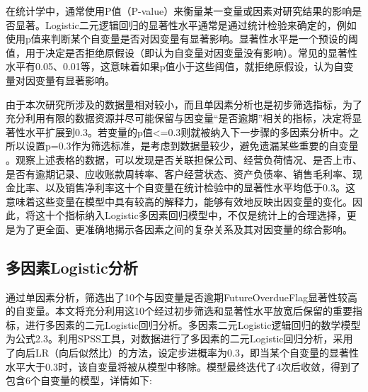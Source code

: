 在统计学中，通常使用P值（P-value）来衡量某一变量或因素对研究结果的影响是否显著。Logistic二元逻辑回归的显著性水平通常是通过统计检验来确定的，例如使用p值来判断某个自变量是否对因变量有显著影响。显著性水平是一个预设的阈值，用于决定是否拒绝原假设（即认为自变量对因变量没有影响）。常见的显著性水平有0.05、0.01等，这意味着如果p值小于这些阈值，就拒绝原假设，认为自变量对因变量有显著影响。

由于本次研究所涉及的数据量相对较小，而且单因素分析也是初步筛选指标，为了充分利用有限的数据资源并尽可能保留与因变量“是否逾期”相关的指标，决定将显著性水平扩展到0.3。若变量的p值<=0.3则就被纳入下一步骤的多因素分析中。之所以设置p=0.3作为筛选标准，是考虑到数据量较少，避免遗漏某些重要的自变量 。观察上述表格的数据，可以发现是否关联担保公司、经营负荷情况、是否上市、是否有逾期记录、应收账款周转率、客户经营状态、资产负债率、销售毛利率、现金比率、以及销售净利率这十个自变量在统计检验中的显著性水平均低于0.3。这意味着这些变量在模型中具有较高的解释力，能够有效地反映出因变量的变化。因此，将这十个指标纳入Logistic多因素回归模型中，不仅是统计上的合理选择，更是为了更全面、更准确地揭示各因素之间的复杂关系及其对因变量的综合影响。

\subsection{多因素Logistic分析}
通过单因素分析，筛选出了10个与因变量是否逾期FutureOverdueFlag显著性较高的自变量。本文将充分利用这10个经过初步筛选和显著性水平放宽后保留的重要指标，进行多因素的二元Logistic回归分析。多因素二元Logistic逻辑回归的数学模型为公式2.3。利用SPSS工具，对数据进行了多因素的二元Logistic回归分析，采用了向后LR（向后似然比）的方法，设定步进概率为0.3，即当某个自变量的显著性水平大于0.3时，该自变量将被从模型中移除。模型最终迭代了4次后收敛，得到了包含6个自变量的模型，详情如下:
\begin{table}[h]
	\caption{客户逾期多因素回归结果}
	
	\label{tab:papercomponents}
	\centering
\end{table}

